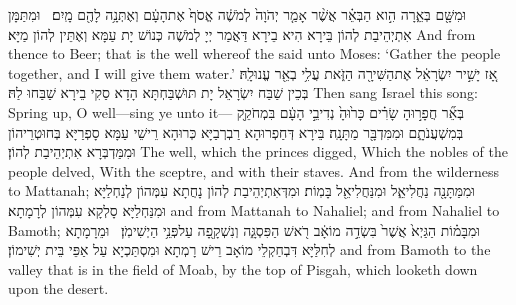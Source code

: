{וּמִשָּׁ֖ם בְּאֵ֑רָה הִ֣וא הַבְּאֵ֗ר אֲשֶׁ֨ר אָמַ֤ר יְהֹוָה֙ לְמֹשֶׁ֔ה אֱסֹף֙ אֶת\maqqaf הָעָ֔ם וְאֶתְּנָ֥ה לָהֶ֖ם מָֽיִם׃ \setuma }
{וּמִתַּמָּן אִתְיְהֵיבַת לְהוֹן בֵּירָא הִיא בֵירָא דַּאֲמַר יְיָ לְמֹשֶׁה כְּנוֹשׁ יָת עַמָּא וְאֶתֵּין לְהוֹן מַיָּא׃}
{And from thence to Beer; that is the well whereof the \lord\space said unto Moses: ‘Gather the people together, and I will give them water.’}{}
{אָ֚ז יָשִׁ֣יר יִשְׂרָאֵ֔ל אֶת\maqqaf הַשִּׁירָ֖ה הַזֹּ֑את עֲלִ֥י בְאֵ֖ר עֱנוּ\maqqaf לָֽהּ׃}
{בְּכֵין שַׁבַּח יִשְׂרָאֵל יָת תּוּשְׁבַּחְתָּא הָדָא סַקִי בֵירָא שַׁבַּחוּ לַהּ׃}
{Then sang Israel this song: Spring up, O well—sing ye unto it—}{}
{בְּאֵ֞ר חֲפָר֣וּהָ שָׂרִ֗ים כָּר֙וּהָ֙ נְדִיבֵ֣י הָעָ֔ם בִּמְחֹקֵ֖ק בְּמִשְׁעֲנֹתָ֑ם וּמִמִּדְבָּ֖ר מַתָּנָֽה׃}
{בֵּירָא דְּחַפְרוּהָא רַבְרְבַיָּא כְּרוּהָא רֵישֵׁי עַמָּא סָפְרַיָּא בְּחוּטְרֵיהוֹן וּמִמַּדְבְּרָא אִתְיְהֵיבַת לְהוֹן׃}
{The well, which the princes digged, Which the nobles of the people delved, With the sceptre, and with their staves. And from the wilderness to Mattanah;}{}
{וּמִמַּתָּנָ֖ה נַחֲלִיאֵ֑ל וּמִנַּחֲלִיאֵ֖ל בָּמֽוֹת׃}
{וּמִדְּאִתְיְהֵיבַת לְהוֹן נָחֲתָא עִמְּהוֹן לְנַחְלַיָּא וּמִנַּחְלַיָּא סָלְקָא עִמְּהוֹן לְרָמָתָא׃}
{and from Mattanah to Nahaliel; and from Nahaliel to Bamoth;}{}
{וּמִבָּמ֗וֹת הַגַּיְא֙ אֲשֶׁר֙ בִּשְׂדֵ֣ה מוֹאָ֔ב רֹ֖אשׁ הַפִּסְגָּ֑ה וְנִשְׁקָ֖פָה עַל\maqqaf פְּנֵ֥י הַיְשִׁימֹֽן׃ \petucha }
{וּמֵרָמָתָא לְחִלַּיָּא דִּבְחַקְלֵי מוֹאָב רֵישׁ רָמְתָא וּמִסְתַּכְיָא עַל אַפֵּי בֵּית יְשִׁימוֹן׃}
{and from Bamoth to the valley that is in the field of Moab, by the top of Pisgah, which looketh down upon the desert.}{}
